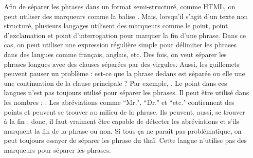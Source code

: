 \documentclass{KodeBook}
\begin{document}
Afin de séparer les phrases dans un format semi-structuré, comme HTML, on peut utiliser des marqueurs comme la balise .
Mais, lorsqu'il s'agit d'un texte non structuré, plusieurs langages utilisent des marqueurs comme le point, point d'exclamation et point d'interrogation pour marquer la fin d'une phrase. 
Dans ce cas, on peut utiliser une expression régulière simple \expword{/[.?!]/} pour délimiter les phrases dans des langues comme français, anglais, etc.
Des fois, on veut séparer les phrases longues avec des clauses séparées par des virgules.
Aussi, les guillemets peuvent pauser un problème : est-ce que la phrase dedans est séparée ou elle une une continuation de la clause principale ?
Par exemple, .
Le point dans ces langues n'est pas toujours utilisé pour séparer les phrases. 
Il peut être utilisé dans les nombres : .
Les abréviations comme ``Mr.", ``Dr." et ``etc." contiennent des points et peuvent se trouver au milieu de la phrase. 
Ils peuvent, aussi, se trouver à la fin ; donc, il faut vraiment être capable de détecter les abréviations et s'ils marquent la fin de la phrase ou non. 
Si tous ça ne parait pas problématique, on peut toujours essayer de séparer les phrase du thaï. 
Cette langue n'utilise pas des marqueurs pour séparer les phrases.
\end{document}
